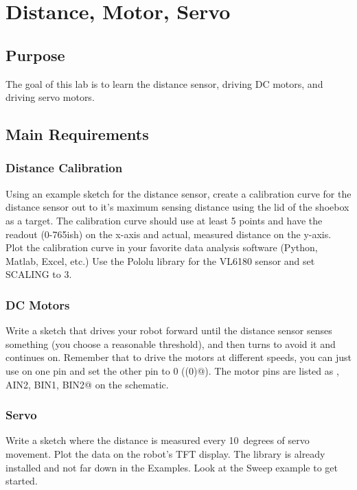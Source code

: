 \chapter{Distance, Motor, Servo}

\section{Purpose}
The goal of this lab is to learn the distance sensor, driving DC motors, and driving 
servo motors.

\section{Main Requirements}
\subsection{Distance Calibration}
Using an example sketch for the distance sensor, create a calibration curve for the distance 
sensor out to it's maximum sensing distance using the lid of the shoebox as a target. The 
calibration curve should use at least 5 points and have the readout (0-765ish) on the x-axis
and actual, measured distance on the y-axis. Plot the calibration curve in your favorite data 
analysis software (Python, Matlab, Excel, etc.) Use the Pololu library for the VL6180 sensor 
and set SCALING to 3.

\subsection{DC Motors}
Write a sketch that drives your robot forward until the distance sensor senses something 
(you choose a reasonable threshold), and then turns to avoid it and continues on. Remember
that to drive the motors at different speeds, you can just use \lstinline@analogWrite@ on 
one pin and set the other pin to 0 (\lstinline@digitalWrite(0)@). The motor pins are listed 
as , AIN2, BIN1, BIN2@ on the schematic.

\subsection{Servo}
Write a sketch where the distance is measured every 10~degrees of servo movement. Plot the
data on the robot's TFT display. The \lstinline@Servo@ library is already installed and 
not far down in the Examples. Look at the Sweep example to get started.

